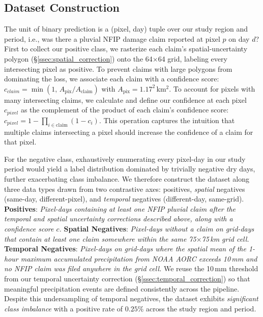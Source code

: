 \subsection{Dataset Construction}\label{ssec:dataset_construction}
The unit of binary prediction is a (pixel, day) tuple over our study region and period, i.e., was there a pluvial NFIP damage claim reported at pixel $p$ on day $d$?
%
First to collect our positive class, we rasterize each claim's spatial-uncertainty polygon (\S\ref{ssec:spatial_correction}) onto the 64$\times$64 grid, labeling every intersecting pixel as positive.
%
To prevent claims with large polygons from dominating the loss, we associate each claim with a confidence score: $c_{claim} = \min(1,\, A_{\text{pix}}/A_{\text{claim}})$ with $A_{\text{pix}} = 1.17^{2}$\,km$^{2}$.
%
To account for pixels with many intersecting claims, we calculate and define our confidence at each pixel $c_{pixel}$ as the complement of the product of each claim's confidence score: $c_{pixel} = 1 - \prod_{i\in\text{claim}}(1 - c_i)$.
%
This operation captures the intuition that multiple claims intersecting a pixel should increase the confidence of a claim for that pixel.

For the negative class, exhaustively enumerating every pixel-day in our study period would yield a label distribution dominated by trivially negative dry days, further exacerbating class imbalance.
%
We therefore construct the dataset along three data types drawn from two contrastive axes: positives, \textit{spatial} negatives (same-day, different-pixel), and \textit{temporal} negatives (different-day, same-grid).
%
    \textbf{Positives}: \emph{Pixel-days containing at least one NFIP pluvial claim after the temporal and spatial uncertainty corrections described above, along with a confidence score $c$.}
    \textbf{Spatial Negatives}: \emph{Pixel-days without a claim on grid-days that contain at least one claim somewhere within the same 75$\times$75\,km grid cell.}
    \textbf{Temporal Negatives}: \emph{Pixel-days on grid-days where the spatial mean of the 1-hour maximum accumulated precipitation from NOAA AORC exceeds 10\,mm and no NFIP claim was filed anywhere in the grid cell.} 
%
We reuse the 10\,mm threshold from our temporal uncertainty correction (\S\ref{ssec:temporal_correction}) so that meaningful precipitation events are defined consistently across the pipeline.
Despite this undersampling of temporal negatives, the dataset exhibits \emph{significant class imbalance} with a positive rate of \tsim$0.25\%$ across the study region and period.



